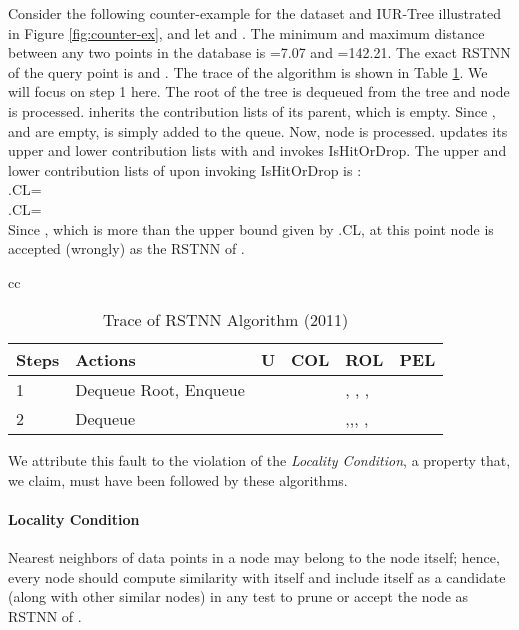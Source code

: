 \documentclass[prodmode,letterpaper]{acmsmall}
\newcommand{\rstknn}{RSTNN\xspace}
\begin{document}
Consider the following counter-example for the dataset and IUR-Tree illustrated in Figure
\ref{fig:counter-ex}, and let  and . The minimum and maximum distance between any two points in the database is =7.07 and =142.21. The exact \rstknn of the
query point  is  and . The trace of the algorithm \cite{lu2011reverse} is shown in Table
\ref{Tab:rstknn_algo}. We will focus on step 1 here. The root of the tree is dequeued from the tree and node  is processed.  inherits the contribution lists of its parent, which is empty. Since ,  and  are empty,  is simply added to the queue. Now, node  is processed.  updates
its upper and lower contribution lists with  and invokes IsHitOrDrop. The upper and lower contribution lists of  upon invoking IsHitOrDrop is :\\
.CL=\\
.CL=\\
Since , which is more than the upper bound given by
.CL, at this point node  is accepted (wrongly) as the \rstknn of . \begin{table}[!htb]
\begin{tabular}{cc}\noindent\begin{minipage}[t]{\linewidth}
\begin{center}
\caption{Trace of \rstknn Algorithm (2011) \label{Tab:rstknn_algo}}
    \begin{tabular}{|l | p{4cm} | l | l | l | l |}
    \hline
    \bfseries{Steps} & \bfseries{Actions} & \bfseries{U}& \textbf{COL} & \textbf{ROL} & \textbf{PEL} \\
    \hline
    1 & Dequeue Root, Enqueue  &  && , , ,  & \\ 
    \hline
    2 & Dequeue  &  &  & ,,,  ,  & \\
    \hline
    \end{tabular}
\end{center}
\end{minipage}
 \end{tabular}
\end{table} 

We attribute this fault to the violation of the {\em Locality
Condition}, a property that, we claim, must have been followed by these
algorithms.

\paragraph{Locality Condition} Nearest neighbors of data points in a node may belong to
the node itself; hence, every node
should compute similarity with itself and include itself as a candidate (along
with other similar nodes) in any test to prune or accept the node as \rstknn of .
\end{document}
